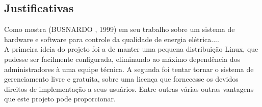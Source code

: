 \documentclass[a4paper, 12pt]{article}
\begin{document}
\subsection{Justificativas}
\indent\indent Como mostra (BUSNARDO , 1999) em seu trabalho sobre um sistema de hardware e software para controle da qualidade de energia elétrica....
\\
\indent A primeira ideia do projeto foi a de manter uma pequena distribuição Linux, que pudesse ser facilmente configurada, eliminando ao máximo dependência 
dos administradores à uma equipe técnica. A segunda foi tentar tornar o sistema de gerenciamento livre e gratuita, sobre uma licença que fornecesse 
os devidos direitos de implementação a seus usuários. Entre outras várias outras vantagens que este projeto pode proporcionar.
\end{document}

